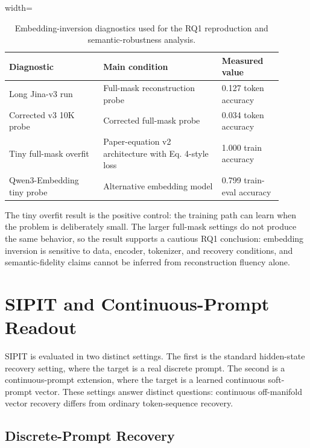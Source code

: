 \documentclass[12pt,a4paper,twoside,openright]{book}
\begin{document}
\begin{table}[!htb]
    \centering
    \scriptsize
    \begin{adjustbox}{width=\textwidth}
    \begin{tabular}{p{0.31\linewidth} p{0.39\linewidth} p{0.20\linewidth}}
        \toprule
        \textbf{Diagnostic} & \textbf{Main condition} & \textbf{Measured value} \\
        \midrule
        Long Jina-v3 run &
        Full-mask reconstruction probe &
        0.127 token accuracy \\
        Corrected v3 10K probe &
        Corrected full-mask probe &
        0.034 token accuracy \\
        Tiny full-mask overfit &
        Paper-equation v2 architecture with Eq. 4-style loss &
        1.000 train accuracy \\
        Qwen3-Embedding tiny probe &
        Alternative embedding model &
        0.799 train-eval accuracy \\
        \bottomrule
    \end{tabular}
    \end{adjustbox}
    \caption{Embedding-inversion diagnostics used for the RQ1 reproduction and
    semantic-robustness analysis.}
    \label{tab:embedding-inversion-diagnostics}
\end{table}

The tiny overfit result is the positive control: the training path can learn
when the problem is deliberately small. The larger full-mask settings do not
produce the same behavior, so the result supports a cautious RQ1 conclusion:
embedding inversion is sensitive to data, encoder, tokenizer, and recovery
conditions, and semantic-fidelity claims cannot be inferred from reconstruction
fluency alone.

\section{SIPIT and Continuous-Prompt Readout}
\label{sec:results-sipit}

SIPIT is evaluated in two distinct settings. The first is the standard
hidden-state recovery setting, where the target is a real discrete prompt. The
second is a continuous-prompt extension, where the target is a learned continuous
soft-prompt vector. These settings answer distinct questions: continuous
off-manifold vector recovery differs from ordinary token-sequence recovery.

\subsection{Discrete-Prompt Recovery}
\label{subsec:results-sipit-gpt2}
\end{document}
